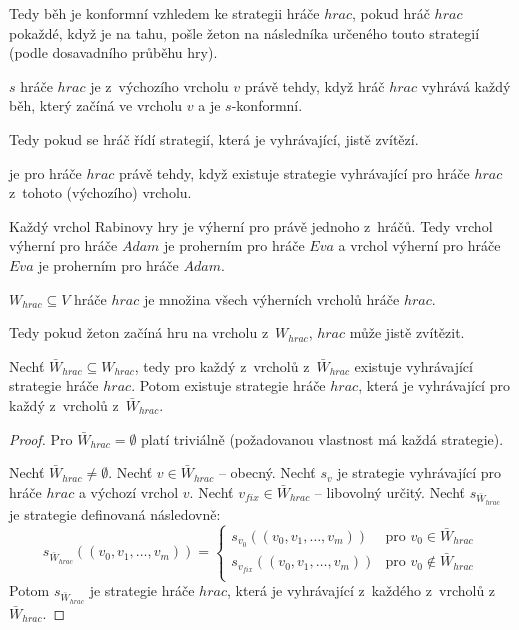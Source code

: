 \begin{informal}
Tedy běh je konformní vzhledem ke strategii hráče $hrac$, pokud hráč $hrac$ pokaždé, když je na tahu, pošle žeton na následníka určeného touto strategií (podle dosavadního průběhu hry).
\end{informal}
\begin{definition}
 $s$ hráče $hrac$ je  z~výchozího vrcholu $v$ právě tehdy, když hráč $hrac$ vyhrává každý běh, který začíná ve vrcholu $v$ a je $s$-konformní.
\end{definition}
\begin{informal}
Tedy pokud se hráč řídí strategií, která je vyhrávající, jistě zvítězí.
\end{informal}
\begin{definition}
 je  pro hráče $hrac$ právě tehdy, když existuje strategie vyhrávající pro hráče $hrac$ z~tohoto (výchozího) vrcholu.
\end{definition}
Každý vrchol Rabinovy hry je výherní pro právě jednoho z~hráčů.\cite[s.~3]{Piterman2006} Tedy vrchol výherní pro hráče $Adam$ je proherním pro hráče $Eva$ a vrchol výherní pro hráče $Eva$ je proherním pro hráče $Adam$.
\begin{definition}
 $W_{hrac} \subseteq V$ hráče $hrac$ je množina všech výherních vrcholů hráče $hrac$.
\end{definition}
\begin{informal}
Tedy pokud žeton začíná hru na vrcholu z~$W_{hrac}$, $hrac$ může jistě zvítězit.
\end{informal}
\begin{theorem}
Nechť $\bar{W}_{hrac} \subseteq W_{hrac}$, tedy pro každý z~vrcholů z~$\bar{W}_{hrac}$ existuje vyhrávající strategie hráče $hrac$. Potom existuje strategie hráče $hrac$, která je vyhrávající pro každý z~vrcholů z~$\bar{W}_{hrac}$.
\end{theorem}
\begin{proof}
Pro $\bar{W}_{hrac} = \emptyset$ platí triviálně (požadovanou vlastnost má každá strategie).

Nechť $\bar{W}_{hrac} \neq \emptyset$. Nechť $v \in \bar{W}_{hrac}$ -- obecný. Nechť $s_v$ je strategie vyhrávající pro hráče $hrac$ a výchozí vrchol $v$. Nechť $v_{fix} \in \bar{W}_{hrac}$ -- libovolný určitý. Nechť $s_{\bar{W}_{hrac}}$ je strategie definovaná následovně:
\begin{equation}
s_{\bar{W}_{hrac}}((v_0, v_1, \dotsc, v_m)) =
\begin{cases}
s_{v_0}((v_0, v_1, \dotsc, v_m)) & \text{pro }v_0 \in \bar{W}_{hrac} \\
s_{v_{fix}}((v_0, v_1, \dotsc, v_m)) & \text{pro }v_0 \notin \bar{W}_{hrac} \\
\end{cases}
\end{equation}
Potom $s_{\bar{W}_{hrac}}$ je strategie hráče $hrac$, která je vyhrávající z~každého z~vrcholů z~$\bar{W}_{hrac}$.
\end{proof}
